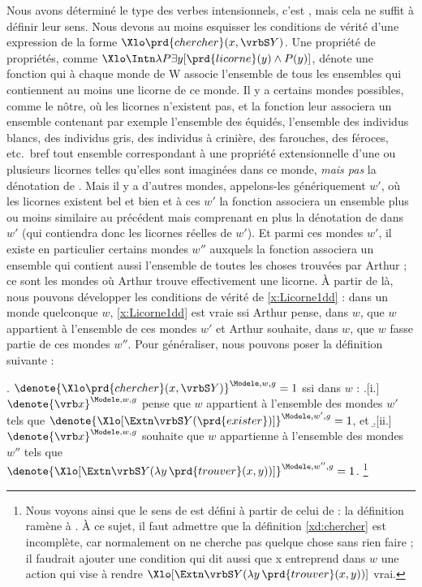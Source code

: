 Nous avons déterminé le type des verbes intensionnels, c'est , mais cela ne suffit à définir leur sens.
Nous devons au moins esquisser les conditions de vérité d'une expression de la forme $\Xlo\prd{chercher}(x,\vrbS Y)$. %
Une propriété de propriétés, comme $\Xlo\Intn\lambda P\exists y[\prd{licorne}(y)\wedge P(y)]$, dénote une fonction qui à chaque monde de \Unv W associe l'ensemble de tous les ensembles qui contiennent au moins une licorne de ce monde.
Il y a certains mondes possibles, comme le nôtre, où les licornes n'existent pas, et la fonction leur associera un ensemble contenant par exemple l'ensemble des équidés, l'ensemble des individus blancs, des individus gris, des individus à crinière, des farouches, des féroces, etc.\ bref tout ensemble correspondant à une propriété extensionnelle d'une ou plusieurs licornes telles qu'elles sont imaginées dans ce monde, \emph{mais pas} la dénotation de .
Mais il y a d'autres mondes, appelons-les génériquement $w'$, où les licornes existent bel et bien et à ces $w'$ la fonction associera un ensemble plus ou moins similaire au précédent mais comprenant en plus la dénotation de   dans $w'$ (qui contiendra donc les licornes réelles de $w'$).  Et parmi ces mondes $w'$, il existe en particulier certains mondes $w''$ auxquels la fonction associera un ensemble qui contient aussi l'ensemble de toutes les choses trouvées par Arthur ; ce sont les mondes où Arthur trouve effectivement une licorne.  À partir de là, nous pouvons développer les conditions de vérité de \ref{x:Licorne1dd} : dans un monde quelconque $w$, \ref{x:Licorne1dd} est vraie ssi Arthur pense, dans $w$, que $w$ appartient à l'ensemble de ces mondes $w'$ et Arthur souhaite, dans $w$, que $w$ fasse partie de ces mondes $w''$.  Pour généraliser, nous pouvons poser la définition suivante :

\fussy

\ex. \label{xd:chercher}
\(\denote{\Xlo\prd{chercher}(x,\vrbS Y)}^{\Modele,w,g}=1\)
ssi dans $w$ :
\a.[i.] \(\denote{\vrb x}^{\Modele,w,g}\) pense que $w$ appartient à l'ensemble des mondes $w'$ tels que \(\denote{\Xlo[\Extn\vrbS Y(\prd{exister})]}^{\Modele,w',g}=1\), \pagebreak et
\b.[ii.] \(\denote{\vrb x}^{\Modele,w,g}\) souhaite que $w$ appartienne à l'ensemble des mondes $w''$ tels que 
\(\denote{\Xlo[\Extn\vrbS Y(\lambda y\,\prd{trouver}(x,y))]}^{\Modele,w'',g}=1\).%
\footnote{Nous voyons ainsi que le sens de  est défini à partir de celui de  : la définition ramène  à . À ce sujet, il faut admettre que la définition \ref{xd:chercher} est incomplète, car normalement on ne cherche pas quelque chose sans rien faire ; il faudrait ajouter une condition qui dit aussi que \vrb x entreprend dans $w$ une action qui vise à rendre $\Xlo[\Extn\vrbS Y(\lambda y\,\prd{trouver}(x,y))]$ vrai.  }


